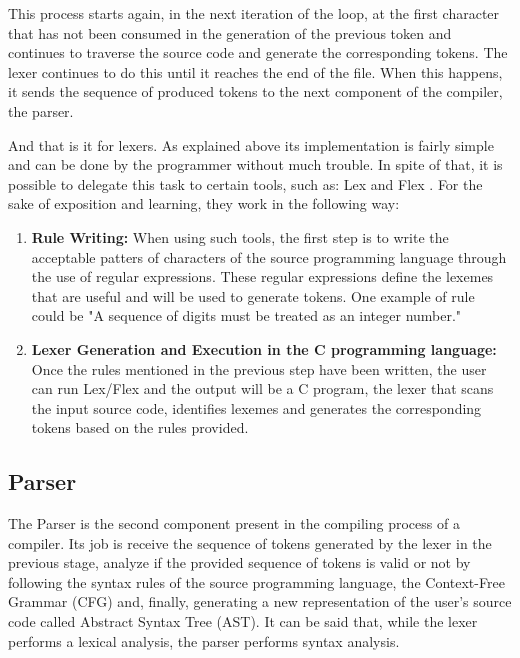 This process starts again, in the next iteration of the loop, at the first character that has not been consumed in the generation of the previous token and continues to traverse the source code and generate the corresponding tokens. The lexer continues to do this until it reaches the end of the file. When this happens, it sends the sequence of produced tokens to the next component of the compiler, the parser.

And that is it for lexers. As explained above its implementation is fairly simple and can be done by the programmer without much trouble. In spite of that, it is possible to delegate this task to certain tools, such as: Lex \cite{lesk1975lex} and Flex \cite{Flex}. For the sake of exposition and learning, they work in the following way:

\begin{enumerate}
    \item \textbf{Rule Writing:} When using such tools, the first step is to write the acceptable patters of characters of the source programming language through the use of regular expressions. These regular expressions define the lexemes that are useful and will be used to generate tokens. One example of rule could be "A sequence of digits must be treated as an integer number."
    
    \item \textbf{Lexer Generation and Execution in the C programming language:} Once the rules mentioned in the previous step have been written, the user can run Lex/Flex and the output will be a C program, the lexer that scans the input source code, identifies lexemes and generates the corresponding tokens based on the rules provided.
    
\end{enumerate}

\subsection{Parser}
The Parser is the second component present in the compiling process of a compiler. Its job is receive the sequence of tokens generated by the lexer in the previous stage, analyze if the provided sequence of tokens is valid or not by following the syntax rules of the source programming language, the Context-Free Grammar (CFG) and, finally, generating a new representation of the user's source code called Abstract Syntax Tree (AST). It can be said that, while the lexer performs a lexical analysis, the parser performs syntax analysis.

